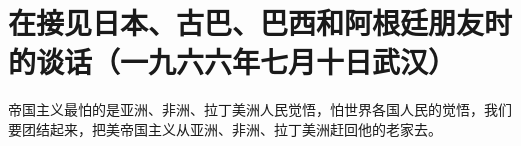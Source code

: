 \section[在接见日本、古巴、巴西和阿根廷朋友时的谈话（一九六六年七月十日武汉）]{在接见日本、古巴、巴西和阿根廷朋友时的谈话（一九六六年七月十日武汉）}


帝国主义最怕的是亚洲、非洲、拉丁美洲人民觉悟，怕世界各国人民的觉悟，我们要团结起来，把美帝国主义从亚洲、非洲、拉丁美洲赶回他的老家去。


